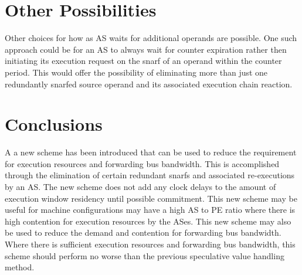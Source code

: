 \documentclass[10pt,dvips]{article}
\begin{document}
\section{Other Possibilities}
%
Other choices for how as AS waits for additional operands
are possible.  One such approach could be for an AS to always
wait for counter expiration rather then initiating its
execution request on the snarf of an operand within the counter
period.  This would offer the possibility of eliminating more
than just one redundantly snarfed source operand and its associated
execution chain reaction.
%
\section{Conclusions}
%
A a new scheme has been introduced that can be used to reduce
the requirement for execution resources and forwarding bus
bandwidth.  This is accomplished through the elimination of
certain redundant snarfs and associated re-executions by an AS.
The new scheme does not add any clock delays to the amount
of execution window residency until possible commitment.
This new scheme may be useful for machine configurations may have
a high AS to PE ratio where there is high contention for execution
resources by the ASes.  This new scheme may also be used to
reduce the demand and contention for forwarding bus bandwidth.
Where there is sufficient execution resources and forwarding bus
bandwidth, this scheme should perform no worse than the previous
speculative value handling method.
%
%
%


\end{document}
